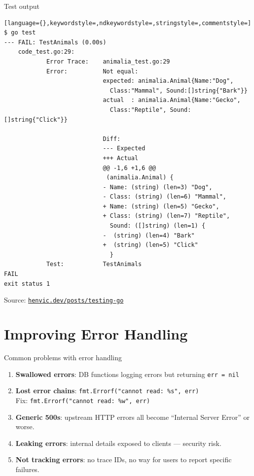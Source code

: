 \documentclass[aspectratio=169,11pt]{beamer}
\begin{document}
\begin{frame}[fragile]{Test output}
\begin{lstlisting}[language={},keywordstyle=,ndkeywordstyle=,stringstyle=,commentstyle=]
$ go test
--- FAIL: TestAnimals (0.00s)
    code_test.go:29:
            Error Trace:    animalia_test.go:29
            Error:          Not equal:
                            expected: animalia.Animal{Name:"Dog",
                              Class:"Mammal", Sound:[]string{"Bark"}}
                            actual  : animalia.Animal{Name:"Gecko",
                              Class:"Reptile", Sound:[]string{"Click"}}

                            Diff:
                            --- Expected
                            +++ Actual
                            @@ -1,6 +1,6 @@
                             (animalia.Animal) {
                            - Name: (string) (len=3) "Dog",
                            - Class: (string) (len=6) "Mammal",
                            + Name: (string) (len=5) "Gecko",
                            + Class: (string) (len=7) "Reptile",
                              Sound: ([]string) (len=1) {
                            -  (string) (len=4) "Bark"
                            +  (string) (len=5) "Click"
                              }
            Test:           TestAnimals
FAIL
exit status 1
\end{lstlisting}
  \vspace{2pt}
  {\small Source: \href{https://henvic.dev/posts/testing-go/}{\texttt{henvic.dev/posts/testing-go}}}
\end{frame}

\section{Improving Error Handling}

\begin{frame}{Common problems with error handling}
  \begin{enumerate}
    \setlength\itemsep{6pt}
    \item \textbf{Swallowed errors}: DB functions logging errors but returning \texttt{err = nil}
    \item \textbf{Lost error chains}: \texttt{fmt.Errorf("cannot read: \%s", err)}\\
          Fix: \texttt{fmt.Errorf("cannot read: \%w", err)}
    \item \textbf{Generic 500s}: upstream HTTP errors all become ``Internal Server Error'' or worse.
    \item \textbf{Leaking errors}: internal details exposed to clients --- security risk.
    \item \textbf{Not tracking errors}: no trace IDs, no way for users to report specific failures.
  \end{enumerate}
\end{frame}
\end{document}
